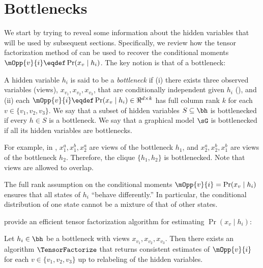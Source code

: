 \section{Bottlenecks}
\label{sec:bottlenecks}

We start by trying to reveal some information about the hidden variables
that will be used by subsequent sections.
Specifically, we review how
the tensor factorization method of \citet{anandkumar13tensor}
can be used to recover the conditional moments
$\mOpp{v}{i} \eqdef \Pr(x_v \mid h_i)$.
The key notion is that of a bottleneck:

\begin{definition}[Bottleneck]
  \label{def:bottleneck}
  A hidden variable $h_i$ is said to be a \emph{bottleneck} if (i) there
  exists three observed variables (views), $x_{v_1}, x_{v_2}, x_{v_3}$,
  that are conditionally independent given $h_i$ (),
  and (ii) each $\mOpp{v}{i} \eqdef \Pr(x_v \mid h_i) \in \Re^{d \times k}$ has full column rank $k$
  for each $v \in \{v_1, v_2, v_3\}$.
  We say that a subset of hidden variables $S \subseteq \bh$ is bottlenecked
  if every $h \in S$ is a bottleneck.
  We say that a graphical model $\sG$ is bottlenecked if all its hidden variables
  are bottlenecks.
\end{definition}
For example, in , $x_1^a,x_1^b,x_2^a$ are views of the bottleneck $h_1$,
and $x_2^a,x_2^b,x_1^b$ are views of the bottleneck $h_2$.  Therefore, the clique
$\{h_1,h_2\}$ is bottlenecked.  Note that views are allowed to overlap.

The full rank assumption on the conditional moments $\mOpp{v}{i} = \Pr(x_v \mid h_i)$
ensures that all states of $h_i$ ``behave differently.''
In particular, the conditional distribution of one state cannot be
a mixture of that of other states.

%  

\citet{anandkumar12moments} provide an efficient tensor factorization algorithm
for estimating $\Pr(x_v \mid h_i)$:
\begin{theorem}
Let $h_i \in \bh$ be a bottleneck with views $x_{v_1},x_{v_2},x_{v_3}$.
Then there exists an algorithm $\TensorFactorize$ that
returns consistent estimates of $\mOpp{v}{i}$ for each $v \in \{v_1,v_2,v_3\}$ up to relabeling of the hidden variables.
\end{theorem}

